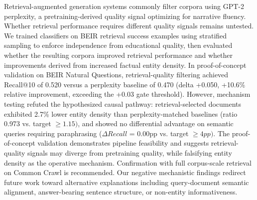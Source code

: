 
Retrieval-augmented generation systems commonly filter corpora using GPT-2 perplexity, a pretraining-derived quality signal optimizing for narrative fluency. Whether retrieval performance requires different quality signals remains untested. We trained classifiers on BEIR retrieval success examples using stratified sampling to enforce independence from educational quality, then evaluated whether the resulting corpora improved retrieval performance and whether improvements derived from increased factual entity density. In proof-of-concept validation on BEIR Natural Questions, retrieval-quality filtering achieved Recall@10 of 0.520 versus a perplexity baseline of 0.470 (delta +0.050, +10.6\% relative improvement, exceeding the +0.03 gate threshold). However, mechanism testing refuted the hypothesized causal pathway: retrieval-selected documents exhibited 2.7\% lower entity density than perplexity-matched baselines (ratio 0.973 vs. target $\geq 1.15)$, and showed no differential advantage on semantic queries requiring paraphrasing ($\Delta Recall$ = 0.00pp vs. target $\geq 4pp)$. The proof-of-concept validation demonstrates pipeline feasibility and suggests retrieval-quality signals may diverge from pretraining quality, while falsifying entity density as the operative mechanism. Confirmation with full corpus-scale retrieval on Common Crawl is recommended. Our negative mechanistic findings redirect future work toward alternative explanations including query-document semantic alignment, answer-bearing sentence structure, or non-entity informativeness.

